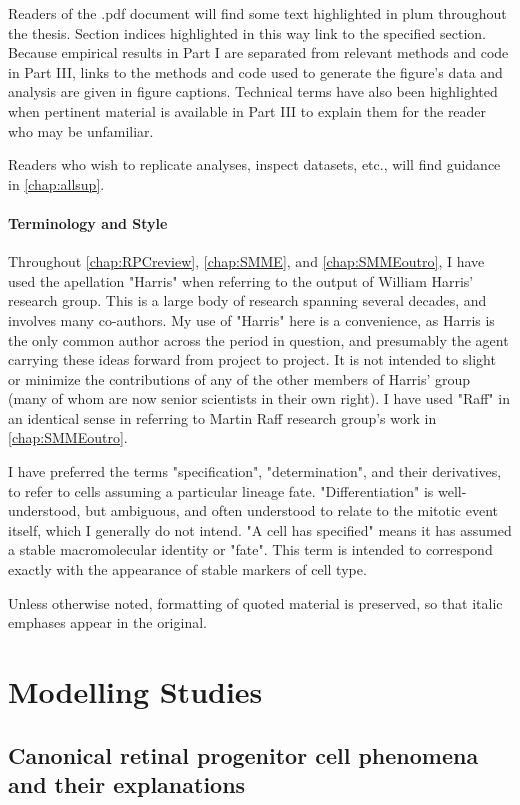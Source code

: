 \documentclass{ut-thesis}
\begin{document}
\begin{NoHyper}
Readers of the .pdf document will find some text highlighted in plum throughout the thesis. Section indices highlighted in this way link to the specified section.  Because empirical results in Part I are separated from relevant methods and code in Part III, links to the methods and code used to generate the figure's data and analysis are given in figure captions. Technical terms have also been highlighted when pertinent material is available in Part III to explain them for the reader who may be unfamiliar.

Readers who wish to replicate analyses, inspect datasets, etc., will find guidance in \autoref{chap:allsup}.

\subsection*{Terminology and Style}
Throughout \autoref{chap:RPCreview}, \autoref{chap:SMME}, and \autoref{chap:SMMEoutro}, I have used the apellation "Harris" when referring to the output of William Harris' research group. This is a large body of research spanning several decades, and involves many co-authors. My use of "Harris" here is a convenience, as Harris is the only common author across the period in question, and presumably the agent carrying these ideas forward from project to project. It is not intended to slight or minimize the contributions of any of the other members of Harris' group (many of whom are now senior scientists in their own right). I have used "Raff" in an identical sense in referring to Martin Raff research group's work in \autoref{chap:SMMEoutro}.

I have preferred the terms "specification", "determination", and their derivatives, to refer to cells assuming a particular lineage fate. "Differentiation" is well-understood, but ambiguous, and often understood to relate to the mitotic event itself, which I generally do not intend. "A cell has specified" means it has assumed a stable macromolecular identity or "fate". This term is intended to correspond exactly with the appearance of stable markers of cell type.

Unless otherwise noted, formatting of quoted material is preserved, so that italic emphases appear in the original.

\part{Modelling Studies}
\chapter{Canonical retinal progenitor cell phenomena and their explanations}
\label{chap:RPCreview}


\end{NoHyper}
\end{document}

